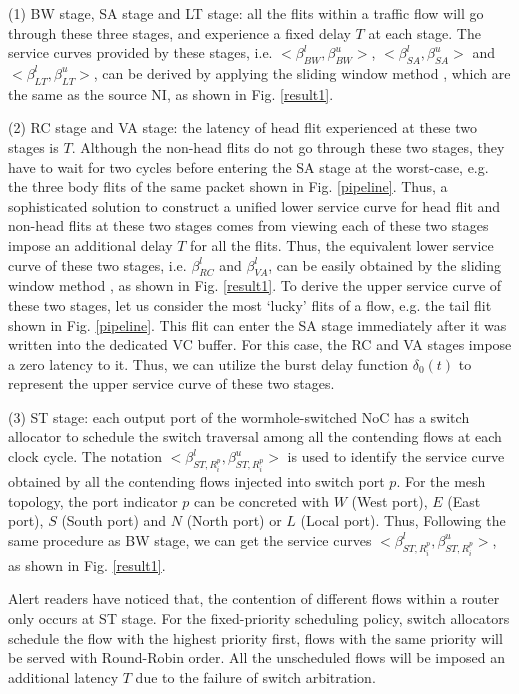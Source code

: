 \documentclass[10pt,journal]{IEEEtran}
\begin{document}
(1) BW stage, SA stage and LT stage: all the flits within a traffic flow will go through these three stages, and experience a fixed delay $T$ at each stage. The service curves provided by these stages, i.e. $<\beta^l_{BW},\beta^u_{BW}>$, $<\beta^l_{SA},\beta^u_{SA}>$ and $<\beta^l_{LT},\beta^u_{LT}>$, can be derived by applying the sliding window method \cite{1253607}, which are the same as the source NI, as shown in Fig. \ref{result1}.

(2) RC stage and VA stage: the latency of head flit experienced at these two stages is $T$. Although the non-head flits do not go through these two stages, they have to wait for two cycles before entering the SA stage at the worst-case, e.g. the three body flits of the same packet shown in Fig. \ref{pipeline}. Thus, a sophisticated solution to construct a unified lower service curve for head flit and non-head flits at these two stages comes from viewing each of these two stages impose an additional delay $T$ for all the flits. Thus, the equivalent lower service curve of these two stages, i.e. $\beta^l_{RC}$ and $\beta^l_{VA}$, can be easily obtained by the sliding window method \cite{1253607}, as shown in Fig. \ref{result1}. To derive the upper service curve of these two stages, let us consider the most `lucky' flits of a flow, e.g. the tail flit shown in Fig. \ref{pipeline}. This flit can enter the SA stage immediately after it was written into the dedicated VC buffer. For this case, the RC and VA stages impose a zero latency to it. Thus, we can utilize the burst delay function $\delta_0(t)$ to represent the upper service curve of these two stages.

(3) ST stage: each output port of the wormhole-switched NoC has a switch allocator to schedule the switch traversal among all the contending flows at each clock cycle. The notation $<\beta_{ST,R_i^{p}}^l,\beta_{ST,R_i^{p}}^u>$ is used to identify the service curve obtained by all the contending flows injected into switch port $p$. For the mesh topology, the port indicator $p$ can be concreted with $W$ (West port), $E$ (East port), $S$ (South port) and $N$ (North port) or $L$ (Local port). Thus, Following the same procedure as BW stage, we can get the service curves $<\beta_{ST,R_i^{p}}^l,\beta_{ST,R_i^{p}}^u>$, as shown in Fig. \ref{result1}.

Alert readers have noticed that, the contention of different flows within a router only occurs at ST stage. For the fixed-priority scheduling policy, switch allocators schedule the flow with the highest priority first, flows with the same priority will be served with Round-Robin order. All the unscheduled flows will be imposed an additional latency $T$ due to the failure of switch arbitration.
\end{document}
